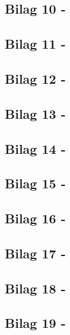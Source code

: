 \begin{appendices}
\subsection*{Bilag 10 - }\label{Bilag10}

\subsection*{Bilag 11 - }\label{Bilag11}

\subsection*{Bilag 12 - }\label{Bilag12}

\subsection*{Bilag 13 - }\label{Bilag13}

\subsection*{Bilag 14 - }\label{Bilag14}

\subsection*{Bilag 15 - }\label{Bilag15}

\subsection*{Bilag 16 - }\label{Bilag16}

\subsection*{Bilag 17 - }\label{Bilag17}

\subsection*{Bilag 18 - }\label{Bilag18}

\subsection*{Bilag 19 - }\label{Bilag19}


\end{appendices}

